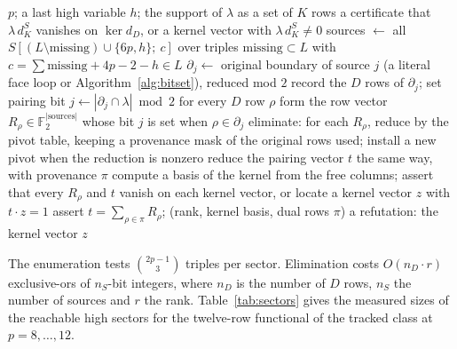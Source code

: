 \documentclass[11pt]{article}
\theoremstyle{definition}
\theoremstyle{remark}
\begin{document}
\begin{algorithm}[t]
\caption{Row-span certificate for one sector $(p,h)$ and one functional $\lambda$.}
\label{alg:rowspan}
\begin{algorithmic}[1]
\Require $p$; a last high variable $h$; the support of $\lambda$ as a set of $K$ rows
\Ensure a certificate that $\lambda\,d^S_K$ vanishes on $\ker d_D$, or a kernel vector with $\lambda\,d^S_K\neq0$
\State sources $\gets$ all $S[(L\setminus\mathrm{missing})\cup\{6p,h\};\ c]$ over triples $\mathrm{missing}\subset L$ with $c=\sum\mathrm{missing}+4p-2-h\in L$
  \State $\partial_j\gets$ original boundary of source $j$ (a literal face loop or Algorithm~\ref{alg:bitset}), reduced mod $2$
  \State record the $D$ rows of $\partial_j$; set pairing bit $j\gets|\partial_j\cap\lambda|\bmod2$
\EndFor
\State for every $D$ row $\rho$ form the row vector $R_\rho\in\mathbb F_2^{|\mathrm{sources}|}$ whose bit $j$ is set when $\rho\in\partial_j$
\State eliminate: for each $R_\rho$, reduce by the pivot table, keeping a provenance mask of the original rows used; install a new pivot when the reduction is nonzero
\State reduce the pairing vector $t$ the same way, with provenance $\pi$
\State compute a basis of the kernel from the free columns; assert that every $R_\rho$ and $t$ vanish on each kernel vector, or locate a kernel vector $z$ with $t\cdot z=1$
  \State assert $t=\sum_{\rho\in\pi}R_\rho$; \Return (rank, kernel basis, dual rows $\pi$)
\Else
  \State \Return a refutation: the kernel vector $z$
\EndIf
\end{algorithmic}
\end{algorithm}

The enumeration tests $\binom{2p-1}{3}$ triples per sector. Elimination costs
$O(n_D\cdot r)$ exclusive-ors of $n_S$-bit integers, where $n_D$ is the number of
$D$ rows, $n_S$ the number of sources and $r$ the rank. Table~\ref{tab:sectors}
gives the measured sizes of the reachable high sectors for the twelve-row
functional of the tracked class at $p=8,\ldots,12$.
\end{document}
